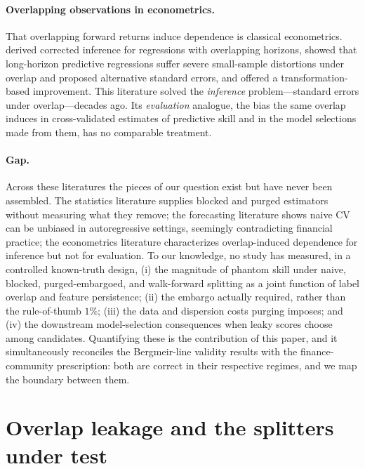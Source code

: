 \documentclass[11pt]{article}
\begin{document}
\paragraph{Overlapping observations in econometrics.} That overlapping
forward returns induce dependence is classical econometrics.
\citet{hansen1980forward} derived corrected inference for regressions with
overlapping horizons, \citet{hodrick1992dividend} showed that long-horizon
predictive regressions suffer severe small-sample distortions under overlap
and proposed alternative standard errors, and \citet{brittenjones2011improved}
offered a transformation-based improvement. This literature solved the
\emph{inference} problem---standard errors under overlap---decades ago. Its
\emph{evaluation} analogue, the bias the same overlap induces in
cross-validated estimates of predictive skill and in the model selections
made from them, has no comparable treatment.

\paragraph{Gap.} Across these literatures the pieces of our question exist
but have never been assembled. The statistics literature supplies blocked and
purged estimators without measuring what they remove; the forecasting
literature shows naive CV can be unbiased in autoregressive settings,
seemingly contradicting financial practice; the econometrics literature
characterizes overlap-induced dependence for inference but not for
evaluation. To our knowledge, no study has measured, in a controlled
known-truth design, (i) the magnitude of phantom skill under naive, blocked,
purged-embargoed, and walk-forward splitting as a joint function of label
overlap and feature persistence; (ii) the embargo actually required, rather
than the rule-of-thumb $1\%$; (iii) the data and dispersion costs purging
imposes; and (iv) the downstream model-selection consequences when leaky
scores choose among candidates. Quantifying these is the contribution of this
paper, and it simultaneously reconciles the Bergmeir-line validity results
with the finance-community prescription: both are correct in their respective
regimes, and we map the boundary between them.

\section{Overlap leakage and the splitters under test}
\label{sec:splitters}
\end{document}

